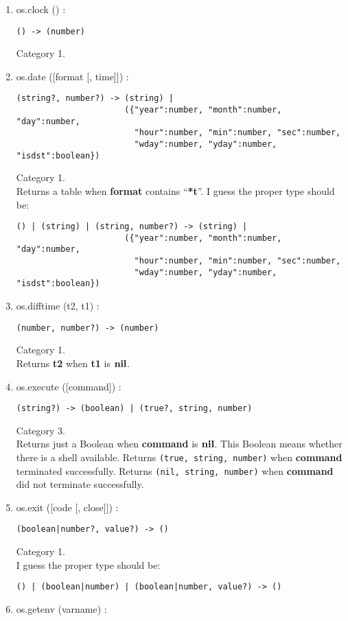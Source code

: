 \begin{enumerate}
\item os.clock () :
\begin{verbatim}
() -> (number)
\end{verbatim}
Category 1.
\item os.date ([format [, time]]) :
\begin{verbatim}
(string?, number?) -> (string) |
                      ({"year":number, "month":number, "day":number,
                        "hour":number, "min":number, "sec":number,
                        "wday":number, "yday":number, "isdst":boolean})
\end{verbatim}
Category 1.
\\
Returns a table when \textbf{format} contains ``\textbf{*t}''.
I guess the proper type should be:
\begin{verbatim}
() | (string) | (string, number?) -> (string) |
                      ({"year":number, "month":number, "day":number,
                        "hour":number, "min":number, "sec":number,
                        "wday":number, "yday":number, "isdst":boolean})
\end{verbatim}
\item os.difftime (t2, t1) :
\begin{verbatim}
(number, number?) -> (number)
\end{verbatim}
Category 1.
\\
Returns \textbf{t2} when \textbf{t1} is $\mathbf{nil}$.
\item os.execute ([command]) :
\begin{verbatim}
(string?) -> (boolean) | (true?, string, number)
\end{verbatim}
Category 3.
\\
Returns just a Boolean when \textbf{command} is $\mathbf{nil}$.
This Boolean means whether there is a shell available.
Returns \texttt{(true, string, number)} when
\textbf{command} terminated successfully.
Returns \texttt{(nil, string, number)} when
\textbf{command} did not terminate successfully.
\item os.exit ([code [, close]]) :
\begin{verbatim}
(boolean|number?, value?) -> ()
\end{verbatim}
Category 1.
\\
I guess the proper type should be:
\begin{verbatim}
() | (boolean|number) | (boolean|number, value?) -> ()
\end{verbatim}
\item os.getenv (varname) :

\end{enumerate}

